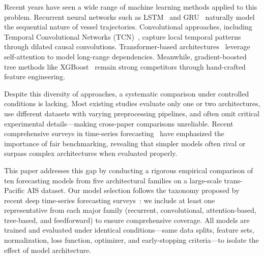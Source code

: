 \documentclass[sigconf,anonymous]{acmart}%
\begin{document}
Recent years have seen a wide range of machine learning methods applied to this problem.
Recurrent neural networks such as LSTM~\cite{zhang2022lstm} and GRU~\cite{han2021gru} naturally model the sequential nature of vessel trajectories.
Convolutional approaches, including Temporal Convolutional Networks (TCN)~\cite{bai2018tcn}, capture local temporal patterns through dilated causal convolutions.
Transformer-based architectures~\cite{dong2023transformer, zhou2021informer} leverage self-attention to model long-range dependencies.
Meanwhile, gradient-boosted tree methods like XGBoost~\cite{chen2016xgboost} remain strong competitors through hand-crafted feature engineering.

Despite this diversity of approaches, a systematic comparison under controlled conditions is lacking.
Most existing studies evaluate only one or two architectures, use different datasets with varying preprocessing pipelines, and often omit critical experimental details---making cross-paper comparisons unreliable.
Recent comprehensive surveys in time-series forecasting~\cite{kim2025comprehensive, zeng2023transformers} have emphasized the importance of fair benchmarking, revealing that simpler models often rival or surpass complex architectures when evaluated properly.

This paper addresses this gap by conducting a rigorous empirical comparison of ten forecasting models from five architectural families on a large-scale trans-Pacific AIS dataset.
Our model selection follows the taxonomy proposed by recent deep time-series forecasting surveys~\cite{kim2025comprehensive}: we include at least one representative from each major family (recurrent, convolutional, attention-based, tree-based, and feedforward) to ensure comprehensive coverage.
All models are trained and evaluated under identical conditions---same data splits, feature sets, normalization, loss function, optimizer, and early-stopping criteria---to isolate the effect of model architecture.
\end{document}
